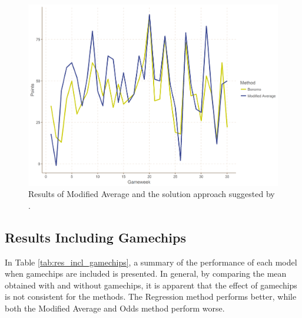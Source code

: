 \begin{figure}[H]
    \centering
    \includegraphics[scale=0.5]{fig/chapter_7/bon_gc_no_gc.png}
    \caption{Results of Modified Average and the solution approach suggested by \cite{Bonomo}.}
\label{fig:avg_vs_bon}    
\end{figure}

\begin{table}[H]
\centering
{}
\caption{Performance of Modified Average and \cite{Bonomo}.}
\label{tab:bonomo_mofidified_average}
\end{table}


\subsection{Results Including Gamechips}

In Table \ref{tab:res_incl_gamechips}, a summary of the performance of each model when gamechips are included is presented. In general, by comparing the mean obtained with and without gamechips, it is apparent that the effect of gamechips is not consistent for the methods. The Regression method performs better, while both the Modified Average and Odds method perform worse.

